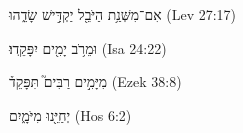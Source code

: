
\begin{exe}

\ex\label{postMN_wayq_exs1}
\texthebrew{
אִם־מִשְּׁנַ֥ת הַיֹּבֵ֖ל יַקְדִּ֣ישׁ שָׂדֵ֑הוּ 
} (Lev 27:17)

\ex\label{postMN_wayq_exs2}
\texthebrew{
וּמֵרֹ֥ב יָמִ֖ים יִפָּקֵֽדוּ׃ 
} (Isa 24:22)

\ex\label{postMN_wayq_exs3}
\texthebrew{
מִיָּמִ֣ים רַבִּים֮ תִּפָּקֵד֒ 
} (Ezek 38:8)

\ex\label{postMN_wayq_exs4}
\texthebrew{
יְחַיֵּ֖נוּ מִיֹּמָ֑יִם 
} (Hos 6:2)

\end{exe}

